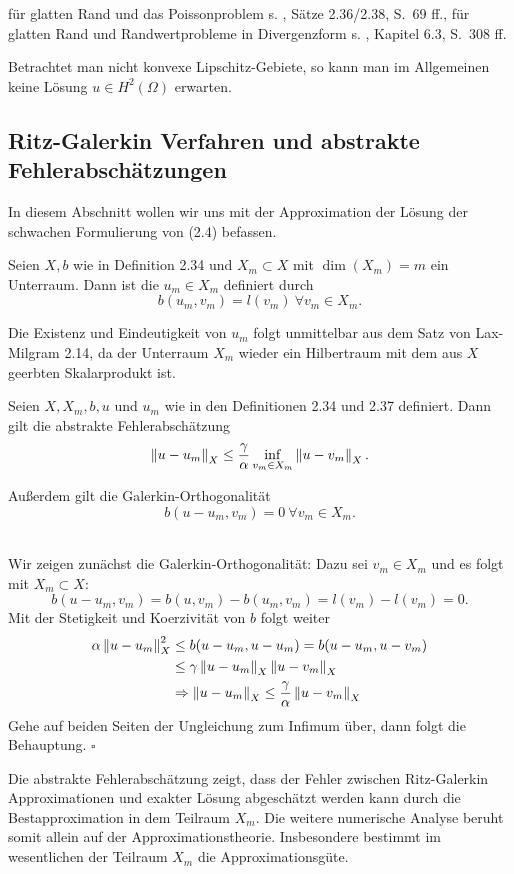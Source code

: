  f\"{u}r glatten Rand und das Poissonproblem s. \cite{Dziuk10}, S\"{a}tze 2.36/2.38, S.~69 ff., f\"{u}r glatten Rand und Randwertprobleme in Divergenzform s. \cite{Evans02}, Kapitel 6.3, S.~308 ff.

Betrachtet man nicht konvexe Lipschitz-Gebiete, so kann man im Allgemeinen keine Lösung $u\in H^2(\Omega)$ erwarten.

\subsection{Ritz-Galerkin Verfahren und abstrakte Fehlerabschätzungen}
In diesem Abschnitt wollen wir uns mit der Approximation der Lösung der schwachen Formulierung von (2.4) befassen.

Seien $X,b$ wie in Definition 2.34 und $X_m\subset X$ mit $\dim (X_m) = m$ ein Unterraum.
Dann ist die  $u_m\in X_m$ definiert durch
\[
b(u_m,v_m)=l(v_m)~\forall v_m\in X_m.
\]

Die Existenz und Eindeutigkeit von $u_m$ folgt unmittelbar aus dem Satz von Lax-Milgram 2.14, da der Unterraum $X_m$ wieder ein Hilbertraum mit dem aus $X$ geerbten Skalarprodukt ist.

Seien $X,X_m,b,u$ und $u_m$ wie in den Definitionen 2.34 und 2.37 definiert. 
Dann gilt die abstrakte Fehlerabschätzung
\[
\left\Vert u-u_m\right\Vert_X \le \frac{\gamma}{\alpha} \inf\limits_{v_m\in X_m} \left\Vert u-v_m\right\Vert_X.
\]

Außerdem gilt die Galerkin-Orthogonalität
\[
b(u-u_m,v_m)=0~\forall v_m\in X_m.
\]

\\
Wir zeigen zunächst die Galerkin-Orthogonalität:
Dazu sei $v_m\in X_m$ und es folgt mit $X_m\subset X$:
\[
b(u-u_m,v_m) = b(u,v_m)-b(u_m,v_m) = l(v_m)-l(v_m)= 0.
\]
Mit der Stetigkeit und Koerzivität von $b$ folgt weiter
\begin{align*}
\alpha \left\Vert u-u_m\right\Vert_X^2 &\le b(u-u_m,u-u_m) = b(u-u_m,u-v_m)\\
&\le \gamma\left\Vert u-u_m\right\Vert_X\left\Vert u-v_m\right\Vert_X\\
&\Rightarrow \left\Vert u-u_m\right\Vert_X \le \frac{\gamma}{\alpha} \left\Vert u-v_m\right\Vert_X
\end{align*}
Gehe auf beiden Seiten der Ungleichung zum Infimum über, dann folgt die Behauptung.
\hfill $\square$

Die abstrakte Fehlerabschätzung zeigt, dass der Fehler zwischen Ritz-Galerkin Approximationen und exakter Lösung abgeschätzt werden kann durch die Bestapproximation in dem Teilraum $X_m$.
Die weitere numerische Analyse beruht somit allein auf der Approximationstheorie.
Insbesondere bestimmt im wesentlichen der Teilraum $X_m$ die Approximationsgüte.

